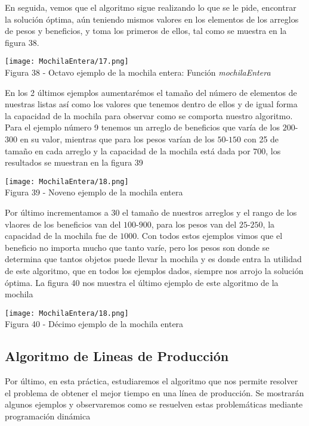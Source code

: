 \documentclass[12pt,twoside]{article}
\begin{document}
En seguida, vemos que el algoritmo sigue realizando lo que se le pide, encontrar la solución óptima, aún teniendo mismos valores en los elementos de los arreglos de pesos y beneficios, y toma los primeros de ellos, tal como se muestra en la figura 38.
\begin{center}
    \texttt{[image: MochilaEntera/17.png]}\\
    Figura 38 - Octavo ejemplo de la mochila entera: Función \textit{mochilaEntera}
\end{center}
En los 2 últimos ejemplos aumentarémos el tamaño del número de elementos de nuestras listas así como los valores que tenemos dentro de ellos y de igual forma la capacidad de la mochila para observar como se comporta nuestro algoritmo. Para el ejemplo número 9 tenemos un arreglo de beneficios que varía de los $200$-$300$ en su valor, mientras que para los pesos varían de los $50$-$150$ con 25 de tamaño en cada arreglo y la capacidad de la mochila está dada por $700$, los resultados se muestran en la figura 39
\begin{center}
    \texttt{[image: MochilaEntera/18.png]}\\
    Figura 39 - Noveno ejemplo de la mochila entera
\end{center}
Por último incrementamos a 30 el tamaño de nuestros arreglos y el rango de los vlaores de los beneficios van del $100$-$900$, para los pesos van del $25$-$250$, la capacidad de la mochila fue de $1000$. Con todos estos ejemplos vimos que el beneficio no importa mucho que tanto varíe, pero los pesos son donde se determina que tantos objetos puede llevar la mochila y es donde entra la utilidad de este algoritmo, que en todos los ejemplos dados, siempre nos arrojo la solución óptima. La figura 40 nos muestra el último ejemplo de este algoritmo de la mochila
\begin{center}
    \texttt{[image: MochilaEntera/18.png]}\\
    Figura 40 - Décimo ejemplo de la mochila entera
\end{center}
\newpage
\subsection{Algoritmo de Lineas de Producción}
Por último, en esta práctica, estudiaremos el algoritmo que nos permite resolver el problema de obtener el mejor tiempo en una línea de producción. Se mostrarán algunos ejemplos y observaremos como se resuelven estas problemáticas mediante programación dinámica
\end{document}
